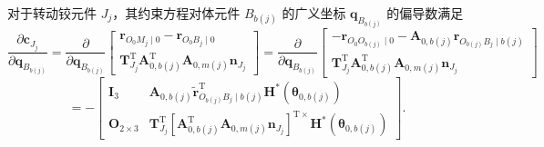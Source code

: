 对于转动铰元件 $J_j$，其约束方程对体元件 $B_{b(j)}$ 的广义坐标 $\boldsymbol{q}_{B_{b(j)}}$ 的偏导数满足
\begin{equation}\label{eq:9.9}
  \frac{\partial \boldsymbol{c}_{J_j}}{\partial \boldsymbol{q}_{B_{b(j)}}}
  = \frac{\partial}{\partial \boldsymbol{q}_{B_{b(j)}}}
  \begin{bmatrix}
    \boldsymbol{r}_{O_0 M_j \mid 0} - \boldsymbol{r}_{O_0 B_j \mid 0} \\[4pt]
    \boldsymbol{T}_{J_j}^{\mathrm{T}} \boldsymbol{A}_{0,b(j)}^{\mathrm{T}} \boldsymbol{A}_{0,m(j)} \boldsymbol{n}_{J_j}
  \end{bmatrix}
  = \frac{\partial}{\partial \boldsymbol{q}_{B_{b(j)}}}
  \begin{bmatrix}
    -\boldsymbol{r}_{O_0 O_{b(j)} \mid 0} - \boldsymbol{A}_{0,b(j)} \boldsymbol{r}_{O_{b(j)} B_j \mid b(j)} \\[4pt]
    \boldsymbol{T}_{J_j}^{\mathrm{T}} \boldsymbol{A}_{0,b(j)}^{\mathrm{T}} \boldsymbol{A}_{0,m(j)} \boldsymbol{n}_{J_j}
  \end{bmatrix}
\end{equation}
\begin{equation}\label{eq:9.10}
  = -\begin{bmatrix}
    \boldsymbol{I}_3 & \boldsymbol{A}_{0,b(j)} \tilde{\boldsymbol{r}}_{O_{b(j)} B_j \mid b(j)}^{\mathrm{T}} \boldsymbol{H}^*(\boldsymbol{\theta}_{0,b(j)}) \\[4pt]
    \boldsymbol{O}_{2\times 3} & \boldsymbol{T}_{J_j}^{\mathrm{T}} \left[ \boldsymbol{A}_{0,b(j)}^{\mathrm{T}} \boldsymbol{A}_{0,m(j)} \boldsymbol{n}_{J_j} \right]^{\mathrm{T} \times} \boldsymbol{H}^*(\boldsymbol{\theta}_{0,b(j)})
  \end{bmatrix}.
\end{equation}

